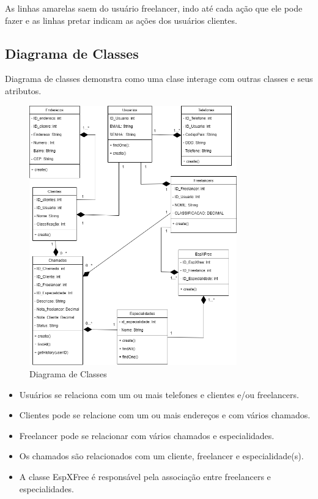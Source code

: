 \documentclass[
  a4paper,%
  12pt,%
  english,%
  brazilian,%
]{article}
\begin{document}
    As linhas amarelas saem do usuário freelancer, indo até cada ação que ele pode fazer e as linhas pretar indicam as ações dos usuários clientes.

\break

\subsection*{Diagrama de Classes}

    Diagrama de classes demonstra como uma clase interage com outras classes e seus atributos.

\begin{figure}[h]
\centering
\caption{Diagrama de Classes}%
\label{fig:diagrama-classe}
 \includegraphics[width=0.8\textwidth]{fotos/DiagramaClassesPI.png}
\end{figure}

\begin{itemize}
    \item Usuários se relaciona com um ou mais telefones e clientes e/ou freelancers.
    \item Clientes pode se relacione com um ou mais endereços e com vários chamados.
    \item Freelancer pode se relacionar com vários chamados e especialidades.
    \item Os chamados são relacionados com um cliente, freelancer e especialidade(s).
    \item A classe EspXFree é responsável pela associação entre freelancers e especialidades.
\end{itemize}
\end{document}

